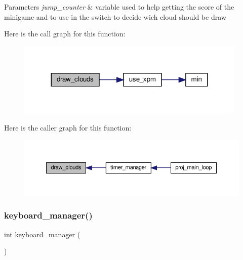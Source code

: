 \begin{DoxyParams}{Parameters}
{\em jump\+\_\+counter} & variable used to help getting the score of the minigame and to use in the switch to decide wich cloud should be draw \\
\hline
\end{DoxyParams}
Here is the call graph for this function\+:\nopagebreak
\begin{figure}[H]
\begin{center}
\leavevmode
\includegraphics[width=311pt]{group__main__functions_ga527ecae69a4a84b54c2c1e0fdfb4b72d_cgraph}
\end{center}
\end{figure}
Here is the caller graph for this function\+:
\nopagebreak
\begin{figure}[H]
\begin{center}
\leavevmode
\includegraphics[width=350pt]{group__main__functions_ga527ecae69a4a84b54c2c1e0fdfb4b72d_icgraph}
\end{center}
\end{figure}
\mbox{\label{group__main__functions_gaaf064e0d3192ae8797d78dcb08bc838e}} 
\subsubsection{\texorpdfstring{keyboard\+\_\+manager()}{keyboard\_manager()}}
{\footnotesize\ttfamily int keyboard\+\_\+manager (\begin{DoxyParamCaption}{ }\end{DoxyParamCaption})}



